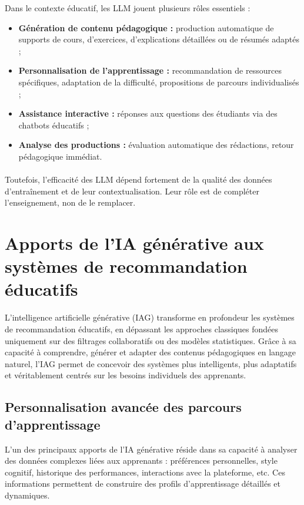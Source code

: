 Dans le contexte éducatif, les LLM jouent plusieurs rôles essentiels :

\begin{itemize}
    \item \textbf{Génération de contenu pédagogique :} production automatique de supports de cours, d’exercices, d’explications détaillées ou de résumés adaptés ;
    \item \textbf{Personnalisation de l’apprentissage :} recommandation de ressources spécifiques, adaptation de la difficulté, propositions de parcours individualisés ;
    \item \textbf{Assistance interactive :} réponses aux questions des étudiants via des chatbots éducatifs ;
    \item \textbf{Analyse des productions :} évaluation automatique des rédactions, retour pédagogique immédiat.
\end{itemize}

\paragraph{}
Toutefois, l’efficacité des LLM dépend fortement de la qualité des données d’entraînement et de leur contextualisation. Leur rôle est de compléter l’enseignement, non de le remplacer.

\section{Apports de l’IA générative aux systèmes de recommandation éducatifs}

L’intelligence artificielle générative (IAG) transforme en profondeur les systèmes de recommandation éducatifs, en dépassant les approches classiques fondées uniquement sur des filtrages collaboratifs ou des modèles statistiques. Grâce à sa capacité à comprendre, générer et adapter des contenus pédagogiques en langage naturel, l’IAG permet de concevoir des systèmes plus intelligents, plus adaptatifs et véritablement centrés sur les besoins individuels des apprenants.

\subsection{Personnalisation avancée des parcours d’apprentissage}

L’un des principaux apports de l’IA générative réside dans sa capacité à analyser des données complexes liées aux apprenants : préférences personnelles, style cognitif, historique des performances, interactions avec la plateforme, etc. Ces informations permettent de construire des profils d’apprentissage détaillés et dynamiques.

